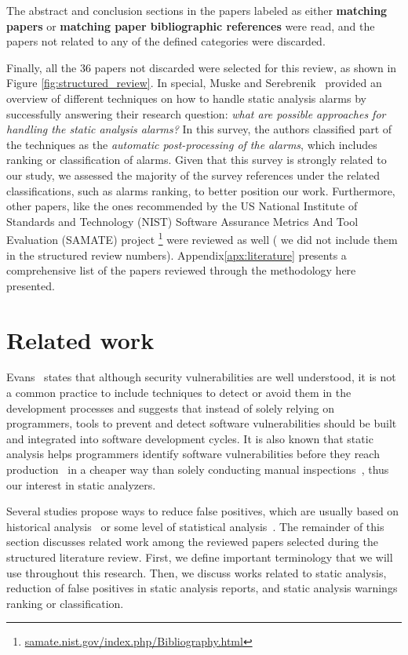 The abstract and conclusion sections in the papers labeled as either
\textbf{matching papers} or \textbf{matching paper bibliographic references} were read, and the
papers not related to any of the defined categories were discarded.

Finally, all the 36 papers not discarded were selected for this review, as
shown in Figure \ref{fig:structured_review}. In special, Muske and
Serebrenik~\cite{muske2016survey} provided an overview of different techniques
on how to handle static analysis alarms by successfully answering their
research question: \textit{what are possible approaches for handling the static
analysis alarms?} In this survey, the authors classified part of the techniques
as the \textit{automatic post-processing of the alarms}, which includes ranking
or classification of alarms. Given that this survey is strongly related to our
study, we assessed the majority of the survey references under the related
classifications, such as alarms ranking, to better position our work.
Furthermore, other papers, like the ones recommended by the US National
Institute of Standards and Technology (NIST) Software Assurance Metrics And
Tool Evaluation (SAMATE) project
\footnote{\url{samate.nist.gov/index.php/Bibliography.html}} were reviewed as
well ( we did not include them in the structured review numbers).
Appendix\ref{apx:literature} presents a comprehensive list of the papers
reviewed through the methodology here presented.

\section{Related work}
\label{sec:related_work}

Evans~\cite{evans_improving_2002} states that although security vulnerabilities
are well understood, it is not a common practice to include techniques to detect
or avoid them in the development processes and suggests that instead of solely
relying on programmers, tools to prevent and detect software vulnerabilities
should be built and integrated into software development cycles. It is also
known that static analysis helps programmers identify software vulnerabilities
before they reach production~\cite{evans_improving_2002} in a cheaper way than
solely conducting manual inspections~\cite{johnson_why_2013}, thus our interest
in static analyzers.

Several studies propose ways to reduce false positives, which are usually based
on historical analysis~\cite{penta_evolution_2008, spacco_tracking_2006,
kim_which_2007} or some level of statistical analysis~\cite{muske2013review,
boogerd2006prioritizing, kremenek2003z, ruthruff_predicting_2008}. The
remainder of this section discusses related work among the reviewed papers
selected during the structured literature review. First, we define important
terminology that we will use throughout this research. Then, we discuss works
related to static analysis, reduction of false positives in static analysis
reports, and static analysis warnings ranking or classification.

